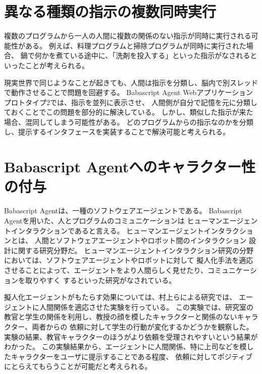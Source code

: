\section{異なる種類の指示の複数同時実行}\label{ux7570ux306aux308bux7a2eux985eux306eux6307ux793aux306eux8907ux6570ux540cux6642ux5b9fux884c}

複数のプログラムから一人の人間に複数の関係のない指示が同時に実行される可能性がある。
例えば、料理プログラムと掃除プログラムが同時に実行された場合、
鍋で何かを煮ている途中に、「洗剤を投入する」といった指示がなされるといったことが考えられる。

現実世界で同じようなことが起きても、人間は指示を分類し、脳内で別スレッドで動作させることで問題を回避する。
Babascript Agent
Webアプリケーションプロトタイプ2では、指示を並列に表示させ、
人間側が自分で記憶を元に分類しておくことでこの問題を部分的に解決している。
しかし、類似した指示が来た場合、混同してしまう可能性がある。
どのプログラムからの指示なのかを分類し、提示するインタフェースを実装することで解決可能と考えられる。

\section{Babascript
Agentへのキャラクター性の付与}\label{babascript-agentux3078ux306eux30adux30e3ux30e9ux30afux30bfux30fcux6027ux306eux4ed8ux4e0e}

Babascript Agentは、一種のソフトウェアエージェントである。 Babascript
Agentを用いた、人とプログラムのコミュニケーションは
ヒューマンエージェントインタラクションであると言える。
ヒューマンエージェントインタラクションとは、
人間とソフトウェアエージェントやロボット間のインタラクション
設計に関する研究分野だ。
ヒューマンエージェントインタラクション研究の分野においては、ソフトウェアエージェントやロボットに対して
擬人化手法を適応させることによって、エージェントをより人間らしく見せたり、コミュニケーションを取りやすく
するといった研究がなされている。

擬人化エージェントがもたらす効果については、村上らによる研究\cite{murakami}では、
エージェントに人間関係を適応させた実験を行っている。
この実験では、研究室の教官と学生の関係を利用し、教授の顔を模したキャラクターと関係のないキャラクター、両者からの
依頼に対して学生の行動が変化するかどうかを観察した。
実験の結果、教官キャラクターのほうがより依頼を受理されやすいという結果がわかった。
この実験結果から、エージェントに人間関係、特に上司などを模したキャラクターをユーザに提示することである程度、
依頼に対してポジティブにとらえてもらうことが可能だと考えられる。

